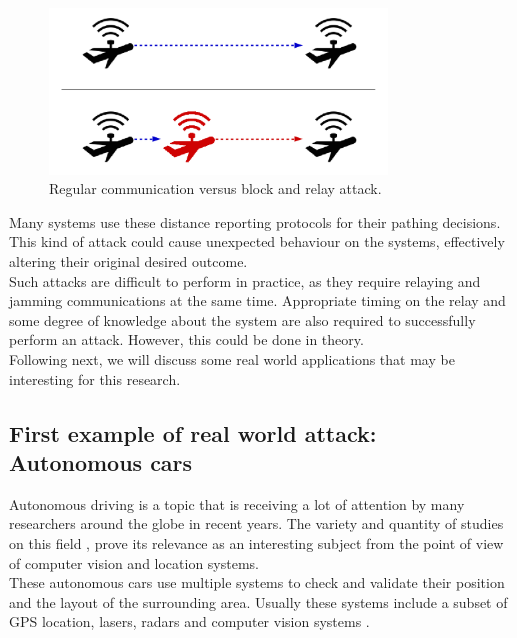 \documentclass{article}
\begin{document}
\begin{figure}[h!]
  \centering
    \includegraphics[width=0.8\textwidth]{images/attack1.png}
  \caption{Regular communication versus block and relay attack.}
  \label{fig:attackexample1}
\end{figure}

Many systems use these distance reporting protocols for their pathing decisions. This kind of attack could cause unexpected behaviour on the systems, effectively altering their original desired outcome.\\

Such attacks are difficult to perform in practice, as they require relaying and jamming communications at the same time. Appropriate timing on the relay and some degree of knowledge about the system are also required to successfully perform an attack. However, this could be done in theory.\\

Following next, we will discuss some real world applications that may be interesting for this research.\\

\subsection{First example of real world attack: Autonomous cars}

Autonomous driving is a topic that is receiving a lot of attention by many researchers around the globe in recent years. The variety and quantity of studies on this field \cite{continentalautonomous, franke1999autonomous, geiger2012we, levinsontowards}, prove its relevance as an interesting subject from the point of view of computer vision and location systems.\\

These autonomous cars use multiple systems to check and validate their position and the layout of the surrounding area. Usually these systems include a subset of GPS location, lasers, radars and computer vision systems \cite{continentalautonomous,levinsontowards}.\\
\end{document}
